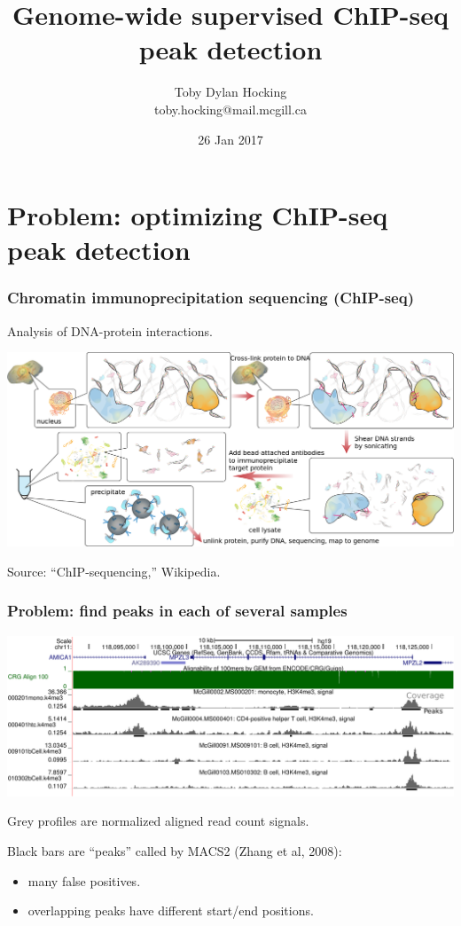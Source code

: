 \documentclass{beamer}
\begin{document}
\title{Genome-wide supervised ChIP-seq peak detection}

\author{
  Toby Dylan Hocking\\
  toby.hocking@mail.mcgill.ca\\
}


\date{26 Jan 2017}

\maketitle

\section{Problem: optimizing ChIP-seq peak detection}

\begin{frame}
  \frametitle{Chromatin immunoprecipitation sequencing (ChIP-seq)}
  Analysis of DNA-protein interactions.

  \includegraphics[width=\textwidth]{Chromatin_immunoprecipitation_sequencing_wide.png}

  Source: ``ChIP-sequencing,'' Wikipedia.
\end{frame}

\begin{frame}
  \frametitle{Problem: find peaks in each of several samples}
  \includegraphics[width=\textwidth]{screenshot-ucsc-edited}

  Grey profiles are normalized aligned read count signals.

  Black bars are ``peaks'' called by MACS2 (Zhang et al, 2008):
  \begin{itemize}
  \item many false positives.
  \item overlapping peaks have different start/end positions.
  \end{itemize}
\end{frame}
\end{document}
